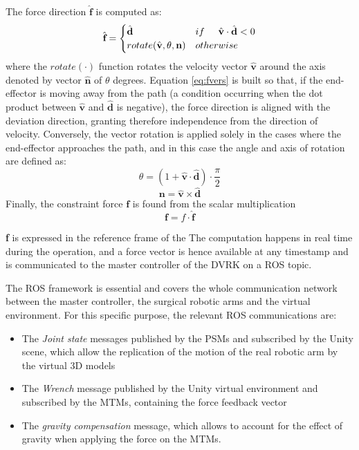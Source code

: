 \documentclass[conference]{IEEEtran}
\newcommand{\vers}[1]{\hat{\textbf{#1}}}
\newcommand{\vect}[1]{\textbf{#1}}
\begin{document}
    The force direction $\hat{\textbf{f}}$ is computed as:
    \begin{equation}
        \vers{f} = \begin{cases}
            \vers{d} & if \hspace{0.5cm}\vers{v}\cdot\vers{d}<0\\
            rotate(\vers{v},\theta,\vect{n}) & otherwise
            \label{eq:fvers}
        \end{cases}
    \end{equation}
    where the $rotate(\cdot)$ function rotates the velocity vector
    $\hat{\textbf{v}}$ around the axis denoted by vector
    $\hat{\textbf{n}}$ of $\theta$ degrees. Equation \ref{eq:fvers} is
    built so that, if the end-effector is moving away from the path (a
    condition occurring when the dot product between $\vers{v}$ and
    $\vers{d}$ is negative), the force direction is aligned with the
    deviation direction, granting therefore independence from the
    direction of velocity. Conversely, the vector rotation is applied
    solely in the cases where the end-effector approaches the path, and in
    this case the angle and axis of rotation are defined as:
    \begin{equation}
        \theta = (1+\vers{v}\cdot\vers{d})\cdot\frac{\pi}{2}
    \end{equation}
    \begin{equation}
        \vect{n} = \vers{v}\times\vers{d}
    \end{equation}
    Finally, the constraint force $\vect{f}$ is found from the scalar
    multiplication
    \begin{equation}
        \vect{f} = f\cdot\vers{f}
        \label{eq:force}
    \end{equation}

    \vect{f} is expressed in the reference frame of the 
    The computation happens in real time during the operation, and a force
    vector is hence available at any timestamp and is communicated to the
    master controller of the DVRK on a ROS topic.

    The ROS framework is essential and covers the whole communication
    network between the master controller, the surgical robotic arms and
    the virtual environment. For this specific purpose, the relevant ROS
    communications are:
    \begin{itemize}
        \item The \textit{Joint state} messages published by the PSMs and
        subscribed by the Unity scene, which allow the replication of the
        motion of the real robotic arm by the virtual 3D models
        \item The \textit{Wrench} message published by the Unity virtual
        environment and subscribed by the MTMs, containing the force
        feedback vector
        \item The \textit{gravity compensation} message, which allows to
        account for the effect of gravity when applying the force on the
        MTMs.
    \end{itemize}
\end{document}
